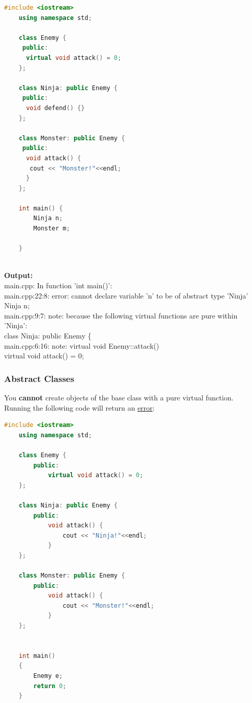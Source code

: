 \documentclass[12pt , a4paper]{article}
\begin{document}
	\begin{lstlisting}[language=C++]
	#include <iostream>
	using namespace std;
	
	class Enemy {
	 public:
	  virtual void attack() = 0;
	};
	
	class Ninja: public Enemy {
	 public:
	  void defend() {}
	};
	
	class Monster: public Enemy {
	 public:
	  void attack() {
	   cout << "Monster!"<<endl;
	  }
	};
	
	int main() {
		Ninja n;
		Monster m;
	
	}
		
	\end{lstlisting}

	\begin{tcolorbox}
	\textbf{Output:}\\
	main.cpp: In function 'int main()':\\
	main.cpp:22:8: error: cannot declare variable 'n' to be of abstract type 'Ninja'\\
	  Ninja n;\\
	main.cpp:9:7: note:   because the following virtual functions are pure within 'Ninja':\\
	 class Ninja: public Enemy \{\\
	main.cpp:6:16: note:    virtual void Enemy::attack()\\
	   virtual void attack() = 0;
	\end{tcolorbox}
	\subsubsection{Abstract Classes}
	You \textbf{cannot} create objects of the base class with a pure virtual function.
	Running the following code will return an \underline{error}:\\
	\begin{lstlisting}[language=C++]
	#include <iostream>
	using namespace std;
	
	class Enemy {
	    public:
	        virtual void attack() = 0;
	};
	
	class Ninja: public Enemy {
	    public:
	        void attack() {
	            cout << "Ninja!"<<endl;
	        }
	};
	
	class Monster: public Enemy {
	    public:
	        void attack() {
	            cout << "Monster!"<<endl;
	        }
	};
	
	
	int main()
	{
	    Enemy e;
	    return 0;
	}		
	\end{lstlisting}
\end{document}
